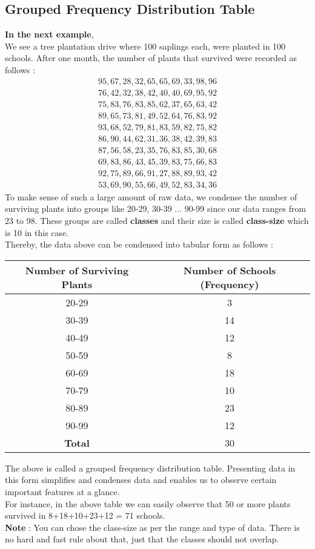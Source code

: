 \documentclass[12pt, letterpaper]{article}
\begin{document}
\subsection{Grouped Frequency Distribution Table}
\textbf{In the next example},\\
We see a tree plantation drive where 100 saplings each, were planted in 100 schools. After one month, the number of plants that survived were recorded as follows :
\begin{align*}
    95,67,28,32,65,65,69,33,98,96 \\
    76,42,32,38,42,40,40,69,95,92 \\
    75,83,76,83,85,62,37,65,63,42 \\
    89,65,73,81,49,52,64,76,83,92 \\
    93,68,52,79,81,83,59,82,75,82 \\
    86,90,44,62,31,36,38,42,39,83 \\
    87,56,58,23,35,76,83,85,30,68 \\
    69,83,86,43,45,39,83,75,66,83 \\
    92, 75,89,66,91,27,88,89,93,42 \\
    53,69,90,55,66,49,52,83,34,36
\end{align*}
To make sense of such a large amount of raw data, we condense the number of surviving plants into groups like 20-29, 30-39 ... 90-99 since our data ranges from 23 to 98. These groups are called \textbf{classes} and their size is called \textbf{class-size} which is 10 in this case.\\
Thereby, the data above can be condensed into tabular form as follows : 
\begin{center}
\begin{tabular}{ |c|c| } 
 \hline
 \textbf{Number of Surviving Plants} & \textbf{Number of Schools (Frequency)} \\
 \hline
 20-29 & 3 \\ 
 30-39 & 14 \\
 40-49 & 12 \\
 50-59 & 8 \\
 60-69 & 18 \\
 70-79 & 10 \\
 80-89 & 23 \\
 90-99 & 12 \\
 \hline
 \textbf{Total} & 30 \\
 \hline
\end{tabular}
\end{center}
The above is called a grouped frequency distribution table. Presenting data in this form simplifies and condenses data and enables us to observe certain important features at a glance.\\
For instance, in the above table we can easily observe that 50 or more plants survived in 8+18+10+23+12 = 71 schools.\\
\textbf{Note} : You can chose the class-size as per the range and type of data. There is no hard and fast rule about that, just that the classes should not overlap.
\end{document}
